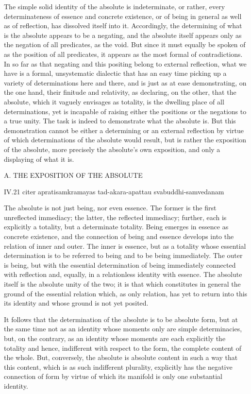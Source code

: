 The simple solid identity of the absolute is indeterminate,
or rather, every determinateness of essence and concrete existence,
or of being in general as well as of reflection,
has dissolved itself into it.
Accordingly, the determining of what is
the absolute appears to be a negating,
and the absolute itself appears only as
the negation of all predicates, as the void.
But since it must equally be spoken of
as the position of all predicates,
it appears as the most formal of contradictions.
In so far as that negating and this positing
belong to external reflection,
what we have is a formal, unsystematic dialectic
that has an easy time picking up
a variety of determinations here and there,
and is just as at ease demonstrating, on the one hand,
their finitude and relativity, as declaring, on the other,
that the absolute, which it vaguely envisages as totality,
is the dwelling place of all determinations,
yet is incapable of raising either
the positions or the negations to a true unity.
The task is indeed to demonstrate what the absolute is.
But this demonstration cannot be either
a determining or an external reflection
by virtue of which determinations of the absolute would result,
but is rather the exposition of the absolute,
more precisely the absolute's own exposition,
and only a displaying of what it is.

A. THE EXPOSITION OF THE ABSOLUTE

IV.21
citer apratisamkramayas tad-akara-apattau svabuddhi-samvedanam

The absolute is not just being, nor even essence.
The former is the first unreflected immediacy;
the latter, the reflected immediacy;
further, each is explicitly a totality,
but a determinate totality.
Being emerges in essence as concrete existence,
and the connection of being and essence develops
into the relation of inner and outer.
The inner is essence, but as a totality
whose essential determination is
to be referred to being and to be being immediately.
The outer is being, but with the essential determination of
being immediately connected with reflection
and, equally, in a relationless identity with essence.
The absolute itself is the absolute unity of the two;
it is that which constitutes in general
the ground of the essential relation
which, as only relation, has yet
to return into this its identity
and whose ground is not yet posited.

It follows that the determination of
the absolute is to be absolute form,
but at the same time not as an identity
whose moments only are simple determinacies,
but, on the contrary, as an identity
whose moments are each explicitly the totality
and hence, indifferent with respect to the form,
the complete content of the whole.
But, conversely, the absolute is absolute content
in such a way that this content,
which is as such indifferent plurality,
explicitly has the negative connection of form
by virtue of which its manifold is
only one substantial identity.

